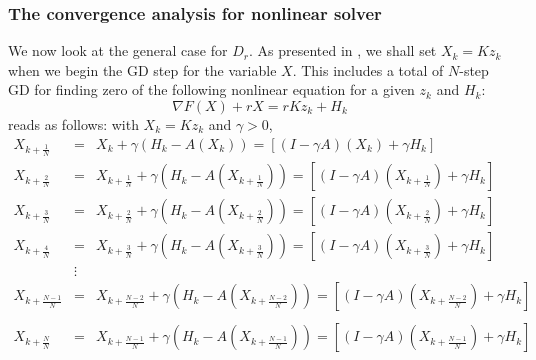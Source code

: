 \begin{itemize}
\subsubsection{The convergence analysis for nonlinear solver}
We now look at the general case for $D_r$. As presented in \cite{mishchenko2022proxskip}, we shall set $X_k = Kz_k$ when we begin the GD step for the variable $X$. This includes a total of $N$-step GD for finding zero of the following nonlinear equation for a given $z_k$ and $H_k$:
\begin{equation} 
\nabla F(X) + r X = rKz_k + H_k 
\end{equation} 
reads as follows: with $X_k = Kz_k$ and $\gamma > 0$,   
\begin{eqnarray*} 
X_{k+\frac{1}{N}} &=& X_{k} + \gamma (H_k - A(X_k)) = [(I - \gamma A)(X_k) + \gamma H_k] \\ 
X_{k+\frac{2}{N}} &=& X_{k+\frac{1}{N}} + \gamma (H_k - A(X_{k+\frac{1}{N}})) = [(I - \gamma A)(X_{k+\frac{1}{N}}) + \gamma H_k] \\ 
X_{k+\frac{3}{N}} &=& X_{k+\frac{2}{N}} + \gamma (H_k - A(X_{k+\frac{2}{N}})) = [(I - \gamma A)(X_{k+\frac{2}{N}}) + \gamma H_k] \\ 
X_{k+\frac{4}{N}} &=& X_{k+\frac{3}{N}} + \gamma (H_k - A(X_{k+\frac{3}{N}})) =  [(I - \gamma A)(X_{k+\frac{3}{N}}) + \gamma H_k] \\
&\vdots& \\  
X_{k+\frac{N-1}{N}} &=& X_{k+\frac{N-2}{N}} + \gamma (H_k - A(X_{k+\frac{N-2}{N}})) =  [(I - \gamma A)(X_{k+\frac{N-2}{N}}) + \gamma H_k] \\  \\
X_{k+\frac{N}{N}} &=& X_{k+\frac{N-1}{N}} + \gamma (H_k - A(X_{k+\frac{N-1}{N}})) = [(I - \gamma A)(X_{k+\frac{N-1}{N}}) + \gamma H_k] \\ 
\end{eqnarray*}

\end{itemize}
